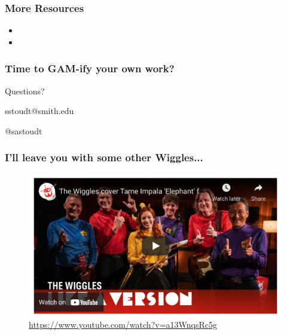 \documentclass{beamer}
\begin{document}
\begin{frame}
\frametitle{More Resources}
\begin{itemize}
\item 
\item 
\end{itemize}
\end{frame}

\begin{frame}
\LARGE

\begin{center}
\frametitle{Time to GAM-ify your own work?}
Questions?

\vspace{.2in}

sstoudt@smith.edu

\vspace{.2in}

@sastoudt

\end{center}
\end{frame}

\begin{frame}
\frametitle{I'll leave you with some other Wiggles...}

\begin{figure}
\includegraphics[scale=.4]{figures/wiggles}
\caption{\url{https://www.youtube.com/watch?v=a13WnqsRc5g }}
\end{figure}

\end{frame}


\end{document}
